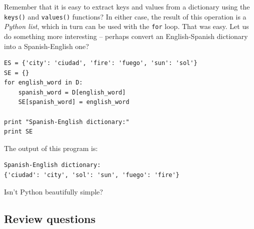 Remember that it is easy to extract keys and values from a dictionary using the 
{\tt keys()} and {\tt values()} functions? In either case, the result of this operation 
is a {\em Python list}, which in turn can be used with the {\tt for} loop. That was easy. Let us do something more interesting -- 
perhaps convert an English-Spanish dictionary into a Spanish-English one? 

\begin{verbatim}
ES = {'city': 'ciudad', 'fire': 'fuego', 'sun': 'sol'}
SE = {}
for english_word in D:
    spanish_word = D[english_word]
    SE[spanish_word] = english_word
    
print "Spanish-English dictionary:"
print SE
\end{verbatim}
The output of this program is:

\begin{verbatim}
Spanish-English dictionary:
{'ciudad': 'city', 'sol': 'sun', 'fuego': 'fire'}
\end{verbatim}
Isn't Python beautifully simple?

\subsection{Review questions}

